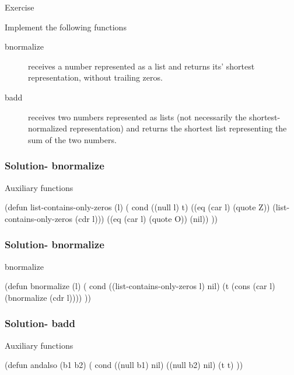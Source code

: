 \documentclass[fleqn]{beamer}
\begin{document}
\begin{frame}{Exercise}
\begin{block}{Implement the following functions}
  \begin{description}
    \item [bnormalize] receives a number represented as a list and returns its'
      shortest representation, without trailing zeros.
    \item [badd] receives two numbers represented as lists (not necessarily the
      shortest-
      normalized representation) and returns the shortest list representing the
      sum of the two numbers.
  \end{description}
\end{block}
\end{frame}

\begin{frame}[fragile]
\frametitle{Solution- bnormalize}
\begin{block}{Auxiliary functions}
  \begin{LISP}
(defun list-contains-only-zeros (l) (
  cond
    ((null l) t)
    ((eq (car l) (quote Z))
      (list-contains-only-zeros (cdr l)))
    ((eq (car l) (quote O)) (nil))
))
    \end{LISP}
\end{block}
\end{frame}

\begin{frame}[fragile]
\frametitle{Solution- bnormalize}
\begin{block}{bnormalize}
  \begin{LISP}
(defun bnormalize (l) (
  cond
    ((list-contains-only-zeros l) nil)
    (t (cons (car l) (bnormalize (cdr l))))
))
    \end{LISP}
\end{block}
\end{frame}

\begin{frame}[fragile]
\frametitle{Solution- badd}
\begin{block}{Auxiliary functions}
  \begin{LISP}
(defun andalso (b1 b2) (
  cond
    ((null b1) nil)
    ((null b2) nil)
    (t t)
))
    \end{LISP}
\end{block}
\end{frame}
\end{document}
